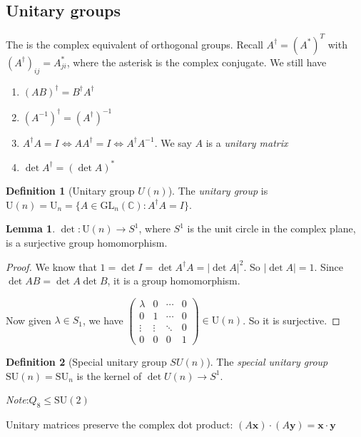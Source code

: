 \documentclass[a4paper]{article}
\theoremstyle{definition}
\newtheorem*{defi}{Definition}
\newtheorem*{lemma}{Lemma}
\newcommand{\mb}[1]{\mathbf{#1}}
\newcommand{\note}{\noindent \emph{Note}:\;}
\newcommand{\C}{\mathbb{C}}
\newcommand{\GL}{\mathrm{GL}}
\newcommand{\U}{\mathrm{U}}
\newcommand{\SU}{\mathrm{SU}}
\begin{document}
\subsection{Unitary groups}
The is the complex equivalent of orthogonal groups. Recall $A^\dagger = (A^*)^T$ with $(A^\dagger)_{ij} = A_{ji}^*$, where the asterisk is the complex conjugate. We still have
\begin{enumerate}
\item $(AB)^\dagger = B^\dagger A^\dagger$
\item $(A^{-1})^\dagger = (A^\dagger)^{-1}$
\item $A^\dagger A = I \Leftrightarrow AA^\dagger = I \Leftrightarrow A^\dagger A^{-1}$. We say $A$ is a \emph{unitary matrix}
\item $\det A^{\dagger} = (\det A)^*$
\end{enumerate}

\begin{defi}[Unitary group $U(n)$]
  The \emph{unitary group} is $\U(n) = \U_n = \{A\in \GL_n(\C): A^\dagger A = I\}$.
\end{defi}

\begin{lemma}
  $\det: \U(n)\to S^1$, where $S^1$ is the unit circle in the complex plane, is a surjective group homomorphism.
\end{lemma}

\begin{proof}
  We know that $1 = \det I = \det A^\dagger A = |\det A|^2$. So $|\det A| = 1$. Since $\det AB = \det A\det B$, it is a group homomorphism.

  Now given $\lambda\in S_1$, we have 
  $\begin{pmatrix}
    \lambda & 0 & \cdots & 0\\
    0 & 1 & \cdots & 0\\
    \vdots & \vdots & \ddots & 0\\
    0 & 0 & 0 & 1
  \end{pmatrix}\in \U(n)$. So it is surjective.
\end{proof}

\begin{defi}[Special unitary group $SU(n)$]
  The \emph{special unitary group} $\SU(n) = \SU_n$ is the kernel of $\det U(n)\to S^1$.
\end{defi}
\note $Q_8 \leq \SU(2)$

Unitary matrices preserve the complex dot product: $(A\mb{x})\cdot (A\mb{y}) = \mb{x}\cdot \mb{y}$
\end{document}
